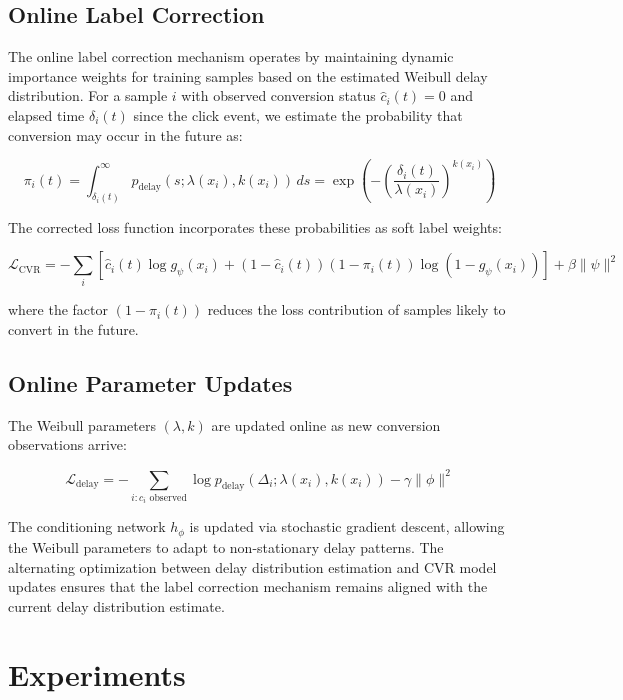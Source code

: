 \documentclass{article}
\begin{document}
\subsection{Online Label Correction}

The online label correction mechanism operates by maintaining dynamic importance weights for training samples based on the estimated Weibull delay distribution. For a sample $i$ with observed conversion status $\hat{c}_i(t) = 0$ and elapsed time $\delta_i(t)$ since the click event, we estimate the probability that conversion may occur in the future as:

\begin{equation}
\pi_i(t) = \int_{\delta_i(t)}^{\infty} p_{\text{delay}}(s; \lambda(x_i), k(x_i)) \, ds = \exp\left(-\left(\frac{\delta_i(t)}{\lambda(x_i)}\right)^{k(x_i)}\right)
\end{equation}

The corrected loss function incorporates these probabilities as soft label weights:

\begin{equation}
\mathcal{L}_{\text{CVR}} = -\sum_{i} \left[ \hat{c}_i(t) \log g_\psi(x_i) + (1-\hat{c}_i(t))(1-\pi_i(t)) \log(1-g_\psi(x_i)) \right] + \beta \|\psi\|^2
\end{equation}

where the factor $(1-\pi_i(t))$ reduces the loss contribution of samples likely to convert in the future.

\subsection{Online Parameter Updates}

The Weibull parameters $(\lambda, k)$ are updated online as new conversion observations arrive:

\begin{equation}
\mathcal{L}_{\text{delay}} = -\sum_{i: c_i \text{ observed}} \log p_{\text{delay}}(\Delta_i; \lambda(x_i), k(x_i)) - \gamma \|\phi\|^2
\end{equation}

The conditioning network $h_\phi$ is updated via stochastic gradient descent, allowing the Weibull parameters to adapt to non-stationary delay patterns. The alternating optimization between delay distribution estimation and CVR model updates ensures that the label correction mechanism remains aligned with the current delay distribution estimate.

\section{Experiments}
\end{document}
